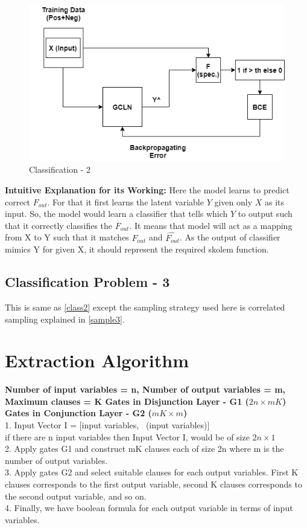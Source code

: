 \begin{figure}
	\centering
    \includegraphics[scale=0.4]{class2.png}
    \caption{Classification - 2}
    \label{fig:class2}
\end{figure}

\noindent\textbf{Intuitive Explanation for its Working: } Here the model learns to predict correct $F_{out}$.
For that it first learns the latent variable $Y$ given only $X$ as its input. So, the model would learn a classifier
that tells which $Y$ to output such that it correctly classifies the $F_{out}$. It means that model will act as a 
mapping from X to Y such that it matches $F_{out}$ and $\hat{F_{out}}$. As the output of classifier mimics Y
for given X, it should represent the required skolem function.

\subsection{Classification Problem - 3}
This is same as \ref{class2} except the sampling strategy used here is correlated sampling
explained in \ref{sample3}.

\section{Extraction Algorithm}
\noindent\textbf{Number of input variables = n, Number of output variables = m, Maximum clauses = K
Gates in Disjunction Layer - G1 ($2n \times mK$)
Gates in Conjunction Layer - G2 ($mK \times m$)}
\\
1. Input Vector I = [input variables, ~(input variables)]\\
if there are n input variables then Input Vector I, would be of size $2n \times 1$
\\
2. Apply gates G1 and construct mK clauses each of size 2n where m is the number of output variables.
\\
3. Apply gates G2 and select suitable clauses for each output variables. First K clauses corresponds to the first output variable, 
second K clauses corresponds to the second output variable, and so on.
\\
4. Finally, we have boolean formula for each output variable in terms of input variables.

